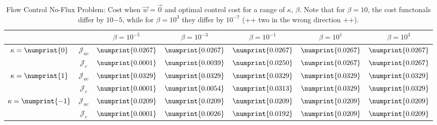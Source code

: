 \begin{table}
\centering
\begin{tabular}{ | c | c || c | c | c | c | c ||}
\hline
\multicolumn{2}{|c||}{}& $\beta = 10^{-5}$ & $\beta = 10^{-3}$ & $\beta = 10^{-1}$ & $\beta = 10^{1}$ & $\beta = 10^{3}$  \\
\hline
\hline
\multirow{2}{*}{$\kappa= \numprint{0}$}  & $\mathcal{J}_{uc}$ & $\numprint{0.0267}$ & $\numprint{0.0267}$ & $\numprint{0.0267}$ & $\numprint{0.0267}$ & $\numprint{0.0267}$\\
 & $\mathcal{J}_c$ & $\numprint{0.0001}$ & $\numprint{0.0039}$ & $\numprint{0.0250}$ & $\numprint{0.0267}$ & $\numprint{0.0267}$\\
\hline
\multirow{2}{*}{$\kappa= \numprint{1}$}  & $\mathcal{J}_{uc}$ & $\numprint{0.0329}$ & $\numprint{0.0329}$ & $\numprint{0.0329}$ & $\numprint{0.0329}$ & $\numprint{0.0329}$\\
 & $\mathcal{J}_c$ & $\numprint{0.0001}$ & $\numprint{0.0054}$ & $\numprint{0.0313}$ & $\numprint{0.0329}$ & $\numprint{0.0329}$\\
\hline
\multirow{2}{*}{$\kappa= \numprint{-1}$}  & $\mathcal{J}_{uc}$ & $\numprint{0.0209}$ & $\numprint{0.0209}$ & $\numprint{0.0209}$ & $\numprint{0.0209}$ & $\numprint{0.0209}$\\
 & $\mathcal{J}_c$ & $\numprint{0.0001}$ & $\numprint{0.0026}$ & $\numprint{0.0192}$ & $\numprint{0.0209}$ & $\numprint{0.0209}$\\
\hline
\end{tabular}
\caption{Flow Control No-Flux Problem: Cost when $\vec{w}=\vec{0}$ and optimal control cost for a range of $\kappa$, $\beta$. Note that for $\beta = 10$, the cost functonals differ by $10{-5}$, while for $\beta = 10^3$ they differ by $10^{-7}$ (++ two in the wrong direction ++).}
\label{TabFCN}
\end{table}